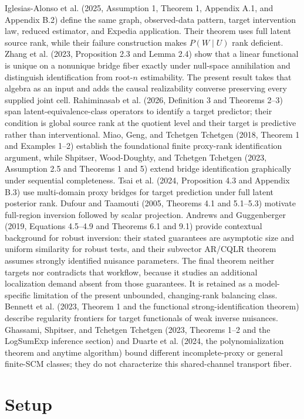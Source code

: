 \documentclass{article}
\begin{document}
Iglesias-Alonso et al. (2025, Assumption 1, Theorem 1, Appendix A.1, and Appendix B.2) define the same graph, observed-data pattern, target intervention law, reduced estimator, and Expedia application. Their theorem uses full latent source rank, while their failure construction makes \(P(W\mid U)\) rank deficient. Zhang et al. (2023, Proposition 2.3 and Lemma 2.4) show that a linear functional is unique on a nonunique bridge fiber exactly under null-space annihilation and distinguish identification from root-\(n\) estimability. The present result takes that algebra as an input and adds the causal realizability converse preserving every supplied joint cell. Rahiminasab et al. (2026, Definition 3 and Theorems 2--3) span latent-equivalence-class operators to identify a target predictor; their condition is global source rank at the quotient level and their target is predictive rather than interventional. Miao, Geng, and Tchetgen Tchetgen (2018, Theorem 1 and Examples 1--2) establish the foundational finite proxy-rank identification argument, while Shpitser, Wood-Doughty, and Tchetgen Tchetgen (2023, Assumption 2.5 and Theorems 1 and 5) extend bridge identification graphically under sequential completeness. Tsai et al. (2024, Proposition 4.3 and Appendix B.3) use multi-domain proxy bridges for target prediction under full latent posterior rank. Dufour and Taamouti (2005, Theorems 4.1 and 5.1--5.3) motivate full-region inversion followed by scalar projection. Andrews and Guggenberger (2019, Equations 4.5--4.9 and Theorems 6.1 and 9.1) provide contextual background for robust inversion: their stated guarantees are asymptotic size and uniform similarity for robust tests, and their subvector AR/CQLR theorem assumes strongly identified nuisance parameters. The final theorem neither targets nor contradicts that workflow, because it studies an additional localization demand absent from those guarantees. It is retained as a model-specific limitation of the present unbounded, changing-rank balancing class. Bennett et al. (2023, Theorem 1 and the functional strong-identification theorem) describe regularity frontiers for target functionals of weak inverse nuisances. Ghassami, Shpitser, and Tchetgen Tchetgen (2023, Theorems 1--2 and the LogSumExp inference section) and Duarte et al. (2024, the polynomialization theorem and anytime algorithm) bound different incomplete-proxy or general finite-SCM classes; they do not characterize this shared-channel transport fiber.

\section{Setup}
\end{document}

